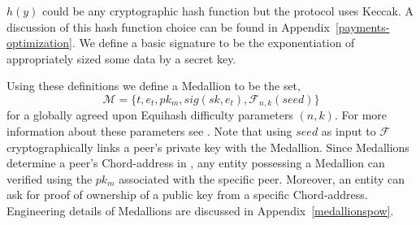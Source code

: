 $h(y)$ could be any cryptographic hash function but the \Orchid{} protocol uses Keccak. A discussion of this hash function choice can be found in Appendix~\ref{payments-optimization}. We define a basic signature to be the exponentiation of appropriately sized some data by a secret key. 

Using these definitions we define a Medallion to be the set,
						$$\mathcal{M} = \{t, e_t, pk_m, sig(sk,e_t), \mathcal{F}_{n,k}(seed)\}$$
for a globally agreed upon Equihash difficulty parameters $(n,k)$. For more information about these parameters see \cite{Equihash}.  Note that using $seed$ as input to $\mathcal{F}$ cryptographically links a peer's private key with the Medallion. Since Medallions determine a peer's Chord-address in \tOM{}, any entity possessing a Medallion can verified using the $pk_m$ associated with the specific peer. Moreover, an entity can ask for proof of ownership of a public key from a specific Chord-address. 
Engineering details of Medallions are discussed in Appendix~\ref{medallionspow}. 


%


























